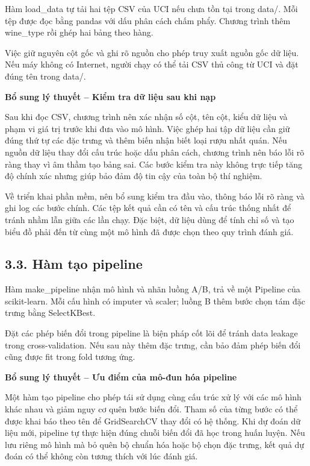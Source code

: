 \documentclass[12pt,a4paper,oneside]{article}
\begin{document}
Hàm load\_data tự tải hai tệp CSV của UCI nếu chưa tồn tại trong data/.
Mỗi tệp được đọc bằng pandas với dấu phân cách chấm phẩy. Chương trình
thêm wine\_type rồi ghép hai bảng theo hàng.

Việc giữ nguyên cột gốc và ghi rõ nguồn cho phép truy xuất nguồn gốc dữ
liệu. Nếu máy không có Internet, người chạy có thể tải CSV thủ công từ
UCI và đặt đúng tên trong data/.


\par\noindent\textbf{Bổ sung lý thuyết -- Kiểm tra dữ liệu sau khi nạp}\par
Sau khi đọc CSV, chương trình nên xác nhận số cột, tên cột, kiểu dữ liệu và phạm vi giá trị trước khi đưa vào mô hình. Việc ghép hai tập dữ liệu cần giữ đúng thứ tự các đặc trưng và thêm biến nhận biết loại rượu nhất quán. Nếu nguồn dữ liệu thay đổi cấu trúc hoặc dấu phân cách, chương trình nên báo lỗi rõ ràng thay vì âm thầm tạo bảng sai. Các bước kiểm tra này không trực tiếp tăng độ chính xác nhưng giúp bảo đảm độ tin cậy của toàn bộ thí nghiệm.\par

Về triển khai phần mềm, nên bổ sung kiểm tra đầu vào, thông báo lỗi rõ ràng và ghi log các bước chính. Các tệp kết quả cần có tên và cấu trúc thống nhất để tránh nhầm lẫn giữa các lần chạy. Đặc biệt, dữ liệu dùng để tính chỉ số và tạo biểu đồ phải đến từ cùng một mô hình đã được chọn theo quy trình đánh giá.\par

\subsection*{3.3. Hàm tạo pipeline}

Hàm make\_pipeline nhận mô hình và nhãn luồng A/B, trả về một Pipeline
của scikit-learn. Mỗi cấu hình có imputer và scaler; luồng B thêm bước
chọn tám đặc trưng bằng SelectKBest.

Đặt các phép biến đổi trong pipeline là biện pháp cốt lõi để tránh data
leakage trong cross-validation. Nếu sau này thêm đặc trưng, cần bảo đảm
phép biến đổi cũng được fit trong fold tương ứng.


\par\noindent\textbf{Bổ sung lý thuyết -- Ưu điểm của mô-đun hóa pipeline}\par
Một hàm tạo pipeline cho phép tái sử dụng cùng cấu trúc xử lý với các mô hình khác nhau và giảm nguy cơ quên bước biến đổi. Tham số của từng bước có thể được khai báo theo tên để GridSearchCV thay đổi có hệ thống. Khi dự đoán dữ liệu mới, pipeline tự thực hiện đúng chuỗi biến đổi đã học trong huấn luyện. Nếu lưu riêng mô hình mà bỏ quên bộ chuẩn hóa hoặc bộ chọn đặc trưng, kết quả dự đoán có thể không còn tương thích với lúc đánh giá.\par
\end{document}
